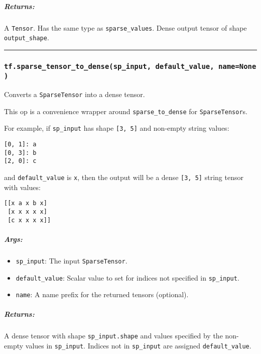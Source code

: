 \subparagraph{Returns: }\label{returns-3}

A \texttt{Tensor}. Has the same type as \texttt{sparse\_values}. Dense
output tensor of shape \texttt{output\_shape}.

\begin{center}\rule{0.5\linewidth}{\linethickness}\end{center}

\subsubsection{\texorpdfstring{\texttt{tf.sparse\_tensor\_to\_dense(sp\_input,\ default\_value,\ name=None)}
}{tf.sparse\_tensor\_to\_dense(sp\_input, default\_value, name=None) }}\label{tf.sparseux5ftensorux5ftoux5fdensespux5finput-defaultux5fvalue-namenone}

Converts a \texttt{SparseTensor} into a dense tensor.

This op is a convenience wrapper around \texttt{sparse\_to\_dense} for
\texttt{SparseTensor}s.

For example, if \texttt{sp\_input} has shape \texttt{{[}3,\ 5{]}} and
non-empty string values:

\begin{verbatim}
[0, 1]: a
[0, 3]: b
[2, 0]: c
\end{verbatim}

and \texttt{default\_value} is \texttt{x}, then the output will be a
dense \texttt{{[}3,\ 5{]}} string tensor with values:

\begin{verbatim}
[[x a x b x]
 [x x x x x]
 [c x x x x]]
\end{verbatim}

\subparagraph{Args: }\label{args-2}

\begin{itemize}
\tightlist
\item
  \texttt{sp\_input}: The input \texttt{SparseTensor}.
\item
  \texttt{default\_value}: Scalar value to set for indices not specified
  in \texttt{sp\_input}.
\item
  \texttt{name}: A name prefix for the returned tensors (optional).
\end{itemize}

\subparagraph{Returns: }\label{returns-4}

A dense tensor with shape \texttt{sp\_input.shape} and values specified
by the non-empty values in \texttt{sp\_input}. Indices not in
\texttt{sp\_input} are assigned \texttt{default\_value}.

